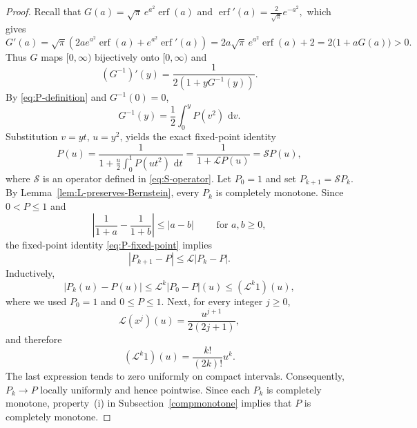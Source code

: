 \documentclass[11pt]{article}
\theoremstyle{definition}
\theoremstyle{remark}
\newcommand{\dd}{\,\mathrm d}
\newcommand{\abs}[1]{\left|#1\right|}
\newcommand{\erf}{\operatorname{erf}}
\begin{document}
\begin{proof}
Recall that $G(a)=\sqrt\pi\,e^{a^2}\erf(a)$ and
$
 \erf'(a)=\frac{2}{\sqrt\pi}e^{-a^2},
$ which gives
\begin{equation}\label{difeqq}
G'(a)
 =\sqrt\pi\left(
     2ae^{a^2}\erf(a)+e^{a^2}\erf'(a)
   \right)
 =2a\sqrt\pi\,e^{a^2}\erf(a)+2
 =2\bigl(1+aG(a)\bigr)>0.
\end{equation}
Thus $G$ maps $[0,\infty)$ bijectively onto $[0,\infty)$ and
\begin{equation}\label{eq:G-inverse-ODE}
 (G^{-1})'(y)=\frac1{2(1+yG^{-1}(y))}.
\end{equation}
By \eqref{eq:P-definition} and $G^{-1}(0)=0$,
\[
 G^{-1}(y)=\frac12\int_0^yP(v^2)\,\dd v.
\]
Substitution $v=yt$, $u=y^2$, yields the exact fixed-point identity
\begin{equation}\label{eq:P-fixed-point}
 P(u)=\frac{1}{1+\frac u2\int_0^1P(ut^2)\,\dd t}=\frac{1}{1+\mathcal L P(u)}
 =\mathcal SP(u),
\end{equation}
where $\mathcal S$ is an operator defined in \eqref{eq:S-operator}.
Let $P_0=1$ and set $P_{k+1}=\mathcal SP_k$.  By
Lemma~\ref{lem:L-preserves-Bernstein}, every $P_k$ is completely
monotone.  Since $0<P\leq1$ and
\[
 \abs{\frac1{1+a}-\frac1{1+b}}\leq\abs{a-b}
 \qquad \mbox{ for }a,b\geq0,
\]
the fixed-point identity \eqref{eq:P-fixed-point} implies
\[
 \abs{P_{k+1}-P}\leq\mathcal L\abs{P_k-P}.
\]
Inductively,
\begin{equation}\label{eq:P-iteration-error}
 \abs{P_k(u)-P(u)}\leq {\mathcal L}^k \abs{P_0-P} (u)\leq(\mathcal L^k1)(u),
\end{equation}
where we used $P_0=1$ and $0\le P  \le 1$. Next, for every integer $j\geq0$,
\[
 \mathcal L(x^j)(u)=\frac{u^{j+1}}{2(2j+1)},
\]
and therefore
\begin{equation}\label{eq:Lk-one}
 (\mathcal L^k1)(u)=\frac{k!}{(2k)!}u^k.
\end{equation}
The last expression tends to zero uniformly on compact intervals.
  Consequently, $P_k\to P$ locally uniformly and hence pointwise.  Since
each $P_k$ is completely monotone, property~(i) in
Subsection~\ref{compmonotone} implies that $P$ is completely monotone. 
\end{proof}
\end{document}
